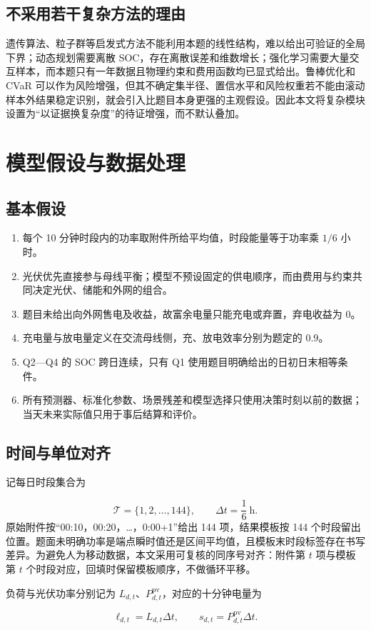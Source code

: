 \documentclass[12pt,a4paper]{ctexart}
\begin{document}
\subsection{不采用若干复杂方法的理由}
遗传算法、粒子群等启发式方法不能利用本题的线性结构，难以给出可验证的全局下界；动态规划需要离散 SOC，存在离散误差和维数增长；强化学习需要大量交互样本，而本题只有一年数据且物理约束和费用函数均已显式给出。鲁棒优化和 CVaR 可以作为风险增强，但其不确定集半径、置信水平和风险权重若不能由滚动样本外结果稳定识别，就会引入比题目本身更强的主观假设。因此本文将复杂模块设置为“以证据换复杂度”的待证增强，而不默认叠加。\par
\section{模型假设与数据处理}
\subsection{基本假设}
\begin{enumerate}[leftmargin=2.2em,itemsep=0.2em]
\item 每个 10 分钟时段内的功率取附件所给平均值，时段能量等于功率乘 $1/6$ 小时。
\item 光伏优先直接参与母线平衡；模型不预设固定的供电顺序，而由费用与约束共同决定光伏、储能和外网的组合。
\item 题目未给出向外网售电及收益，故富余电量只能充电或弃置，弃电收益为 0。
\item 充电量与放电量定义在交流母线侧，充、放电效率分别为题定的 $0.9$。
\item Q2—Q4 的 SOC 跨日连续，只有 Q1 使用题目明确给出的日初日末相等条件。
\item 所有预测器、标准化参数、场景残差和模型选择只使用决策时刻以前的数据；当天未来实际值只用于事后结算和评价。
\end{enumerate}
\subsection{时间与单位对齐}
记每日时段集合为\par
\begin{equation}
\mathcal T=\{1,2,\ldots,144\},\qquad \Delta t=\frac{1}{6}\ \mathrm h .
\end{equation}
原始附件按“00:10，00:20，…，0:00+1”给出 144 项，结果模板按 144 个时段留出位置。题面未明确功率是端点瞬时值还是区间平均值，且模板末时段标签存在书写差异。为避免人为移动数据，本文采用可复核的同序号对齐：附件第 $t$ 项与模板第 $t$ 个时段对应，回填时保留模板顺序，不做循环平移。\par
负荷与光伏功率分别记为 $L_{d,t}$、$P^{\mathrm{pv}}_{d,t}$，对应的十分钟电量为\par
\begin{equation}
\ell_{d,t}=L_{d,t}\Delta t,\qquad s_{d,t}=P^{\mathrm{pv}}_{d,t}\Delta t.
\end{equation}
\end{document}
